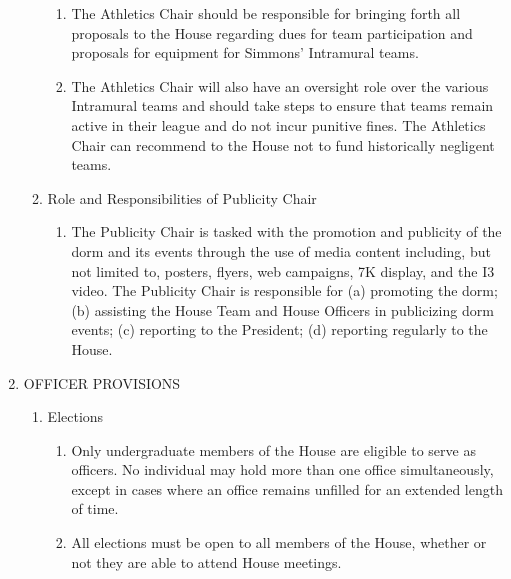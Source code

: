 \documentclass[letterpaper]{article}
\begin{document}
\begin{enumerate}
\begin{enumerate}
\begin{enumerate}
\item The Athletics Chair should be responsible for bringing forth all proposals to the House regarding dues for team participation and proposals for equipment for Simmons' Intramural teams.

\item The Athletics Chair will also have an oversight role over the various Intramural teams and should take steps to ensure that teams remain active in their league and do not incur punitive fines. The Athletics Chair can recommend to the House not to fund historically negligent teams.

\end{enumerate}

\item Role and Responsibilities of Publicity Chair

\begin{enumerate}

\item The Publicity Chair is tasked with the promotion and publicity of the dorm and its events through the use of media content including, but not limited to, posters, flyers, web campaigns, 7K display, and the I3 video. The Publicity Chair is responsible for (a) promoting the dorm; (b) assisting the House Team and House Officers in publicizing dorm events; (c) reporting to the President; (d) reporting regularly to the House.

\end{enumerate}

\end{enumerate}

\item OFFICER PROVISIONS 

\begin{enumerate}

\item Elections 

\begin{enumerate}

\item Only undergraduate members of the House are eligible to serve as officers. No individual may hold more than one office simultaneously, except in cases where an office remains unfilled for an extended length of time.

\item All elections must be open to all members of the House, whether or not they are able to attend House meetings.


\end{enumerate}
\end{enumerate}
\end{enumerate}
\end{document}
